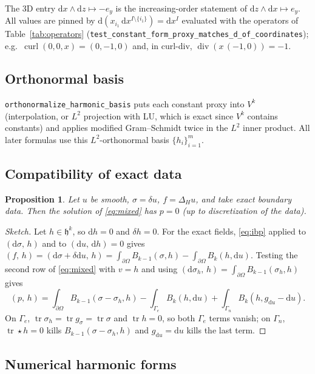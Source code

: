 \documentclass[11pt]{article}
\newcommand{\dd}{\mathrm{d}}
\newcommand{\cod}{\delta}
\newcommand{\tr}{\operatorname{tr}}
\newcommand{\hodge}{\star}
\newcommand{\Hspace}{\mathfrak{h}}
\newcommand{\curl}{\operatorname{curl}}
\renewcommand{\div}{\operatorname{div}}
\newcommand{\code}[1]{\texttt{#1}}
\newcommand{\ip}[2]{\left(#1,\,#2\right)}
\newtheorem{proposition}{Proposition}
\theoremstyle{remark}
\begin{document}
The 3D entry $\dd x\wedge\dd z\mapsto -e_y$ is the increasing-order statement of
$\dd z\wedge\dd x\mapsto e_y$. All values are pinned by
$\dd(x_{i_1}\,\dd x^{I\setminus\{i_1\}}) = \dd x^I$ evaluated with the operators of
Table~\ref{tab:operators} (\code{test\_constant\_form\_proxy\_matches\_d\_of\_coordinates}); e.g.\
$\curl(0,0,x)=(0,-1,0)$ and, in curl-div, $\div(x\,(-1,0))=-1$.

\subsection{Orthonormal basis}

\code{orthonormalize\_harmonic\_basis} puts each constant proxy into $V^k$ (interpolation, or $L^2$
projection with LU, which is exact since $V^k$ contains constants) and applies modified
Gram--Schmidt twice in the $L^2$ inner product. All later formulas use this $L^2$-orthonormal basis
$\{h_i\}_{i=1}^m$.

\subsection{Compatibility of exact data}

\begin{proposition}
Let $u$ be smooth, $\sigma=\cod u$, $f=\Delta_H u$, and take exact boundary data. Then the solution
of \eqref{eq:mixed} has $p=0$ (up to discretization of the data).
\end{proposition}
\begin{proof}[Sketch]
Let $h\in\Hspace^k$, so $\dd h=0$ and $\cod h=0$. For the exact fields, \eqref{eq:ibp} applied to
$\ip{\dd\sigma}{h}$ and to $\ip{\dd u}{\dd h}=0$ gives
$\ip{f}{h}=\ip{\dd\sigma+\cod\dd u}{h}=\int_{\partial\Omega}B_{k-1}(\sigma,h)-\int_{\partial\Omega}B_k(h,\dd u)$.
Testing the second row of \eqref{eq:mixed} with $v=h$ and using
$\ip{\dd\sigma_h}{h}=\int_{\partial\Omega}B_{k-1}(\sigma_h,h)$ gives
\[
  \ip{p}{h} = \int_{\partial\Omega} B_{k-1}(\sigma-\sigma_h,h) - \int_{\Gamma_e}B_k(h,\dd u)
            + \int_{\Gamma_n}B_k(h,g_{\dd u}-\dd u) .
\]
On $\Gamma_e$, $\tr\sigma_h=\tr g_\sigma=\tr\sigma$ and $\tr h=0$, so both $\Gamma_e$ terms vanish; on
$\Gamma_n$, $\tr\hodge h=0$ kills $B_{k-1}(\sigma-\sigma_h,h)$ and $g_{\dd u}=\dd u$ kills the last term.
\end{proof}
\subsection{Numerical harmonic forms}
\end{document}
